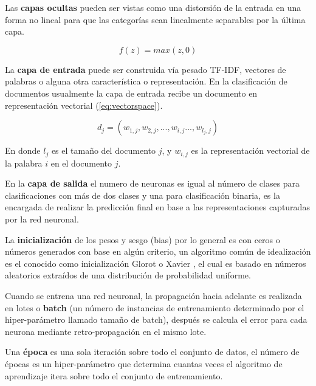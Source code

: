 Las\textbf{ capas ocultas} pueden ser vistas como una distorsión de la entrada en una forma no lineal para que las categorías sean linealmente separables por la última capa.

\begin{equation} \label{eq:RELU}
    f(z)= max(z,0)
\end{equation}

La \textbf{capa de entrada} puede ser construida vía pesado TF-IDF, vectores de palabras o alguna otra característica o representación. En la clasificación de documentos usualmente la capa de entrada recibe un documento en representación vectorial (\ref{eq:vectorspace}).

\begin{equation} \label{eq:vectorspace}
d_{j} = (w_{1,j},w_{2,j},...,w_{i,j}...,w_{l_{j},j})
\end{equation}

En donde $l_{j}$ es el tamaño del documento $j$, y $w_{i,j}$ es la representación vectorial de la palabra $i$ en el documento $j$.

En la \textbf{capa de salida} el numero de neuronas es igual al número de clases para clasificaciones con más de dos clases y una para clasificación binaria, es la encargada de realizar la predicción final en base a las representaciones capturadas por la red neuronal.

La \textbf{inicialización} de los pesos y sesgo (bias) por lo general es con ceros o números generados con base en algún criterio, un algoritmo común de idealización es el conocido como inicialización Glorot o Xavier \citep{glorot2010understanding}, el cual es basado en números aleatorios extraídos de una distribución de probabilidad uniforme.

Cuando se entrena una red neuronal, la propagación hacia adelante es realizada en lotes o \textbf{batch} (un número de instancias de entrenamiento determinado por el hiper-parámetro llamado tamaño de batch), después se calcula el error para cada neurona mediante retro-propagación en el mismo lote. 

Una \textbf{época} es una sola iteración sobre todo el conjunto de datos, el número de épocas es un hiper-parámetro que determina cuantas veces el algoritmo de aprendizaje itera sobre todo el conjunto de entrenamiento.


